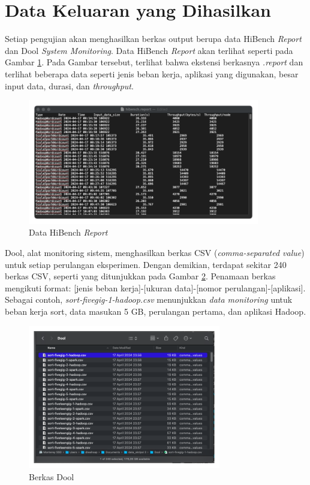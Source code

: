 \section{Data Keluaran yang Dihasilkan}

Setiap pengujian akan menghasilkan berkas output berupa data HiBench \textit{Report} dan Dool \textit{System Monitoring}. Data HiBench \textit{Report} akan terlihat seperti pada Gambar \ref{fig:data-hibench-report}. Pada Gambar tersebut, terlihat bahwa ekstensi berkasnya \textit{.report} dan terlihat beberapa data seperti jenis beban kerja, aplikasi yang digunakan, besar input data, durasi, dan \textit{throughput}.

\begin{figure}[h]
    \centering
    \includegraphics[width=0.9\textwidth]{figures/ch04/data-hibench}
    \caption{Data HiBench \textit{Report}}
    \label{fig:data-hibench-report}
\end{figure}

Dool, alat monitoring sistem, menghasilkan berkas CSV (\textit{comma-separated value}) untuk setiap perulangan eksperimen. Dengan demikian, terdapat sekitar 240 berkas CSV, seperti yang ditunjukkan pada Gambar \ref{fig:data-dool-luar}. Penamaan berkas mengikuti format: [jenis beban kerja]-[ukuran data]-[nomor perulangan]-[aplikasi]. Sebagai contoh, \textit{sort-fivegig-1-hadoop.csv} menunjukkan \textit{data monitoring} untuk beban kerja sort, data masukan 5 GB, perulangan pertama, dan aplikasi Hadoop.

\begin{figure}[h]
    \centering
    \includegraphics[width=0.75\textwidth]{figures/ch04/data-dool-luar}
    \caption{Berkas Dool}
    \label{fig:data-dool-luar}
\end{figure}

